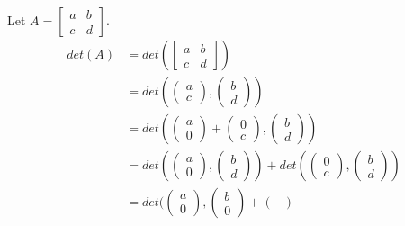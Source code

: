 \begin{example}
    Let $A=\begin{bmatrix}
        a & b \\
        c & d
    \end{bmatrix}$.
    \begin{align*}
        det(A)&=det(\begin{bmatrix}
        a & b \\
        c & d
    \end{bmatrix})\\
    &=det(\begin{pmatrix}
        a \\ c
    \end{pmatrix}, \begin{pmatrix}
        b \\ d
    \end{pmatrix})\\
    &=det(\begin{pmatrix}
        a \\ 0
    \end{pmatrix}+\begin{pmatrix}
        0 \\ c
    \end{pmatrix}, \begin{pmatrix}
        b \\ d
    \end{pmatrix})\\
    &=det(\begin{pmatrix}
        a \\ 0
    \end{pmatrix}, \begin{pmatrix}
        b \\ d
    \end{pmatrix})+det(\begin{pmatrix}
        0 \\ c
    \end{pmatrix}, \begin{pmatrix}
        b \\ d
    \end{pmatrix})\tag{by Multilinearity}\\
    &=det(\begin{pmatrix}
        a \\ 0
    \end{pmatrix}, \begin{pmatrix}
        b \\ 0
    \end{pmatrix}+\begin{pmatrix}

\end{pmatrix}
\end{align*}
\end{example}
